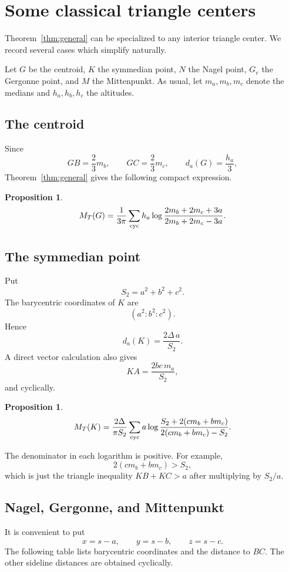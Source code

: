\documentclass[11pt]{article}
\newtheorem{proposition}[theorem]{Proposition}
\theoremstyle{remark}
\newcommand{\area}{\Delta}
\begin{document}
\section{Some classical triangle centers}

Theorem~\ref{thm:general} can be specialized to any interior triangle
center.  We record several cases which simplify naturally.

Let $G$ be the centroid, $K$ the symmedian point, $N$ the Nagel point,
$G_e$ the Gergonne point, and $M$ the Mittenpunkt.  As usual, let
$m_a,m_b,m_c$ denote the medians and $h_a,h_b,h_c$ the altitudes.

\subsection{The centroid}

Since
\[
 GB=\frac23m_b,\qquad
 GC=\frac23m_c,\qquad
 d_a(G)=\frac{h_a}{3},
\]
Theorem~\ref{thm:general} gives the following compact expression.

\begin{proposition}\label{prop:centroid}
\[
 {
 M_T(G)=
 \frac1{3\pi}\sum_{\rm cyc}
 h_a\log
 \frac{2m_b+2m_c+3a}
      {2m_b+2m_c-3a}.
 }
\]
\end{proposition}

\subsection{The symmedian point}

Put
\[
 S_2=a^2+b^2+c^2.
\]
The barycentric coordinates of $K$ are
\[
 (a^2:b^2:c^2).
\]
Hence
\[
 d_a(K)=\frac{2\area\,a}{S_2}.
\]
A direct vector calculation also gives
\[
 KA=\frac{2bc\,m_a}{S_2},
\]
and cyclically.

\begin{proposition}\label{prop:symmedian}
\[
 {
 M_T(K)=
 \frac{2\area}{\pi S_2}
 \sum_{\rm cyc}
 a\log
 \frac{S_2+2(cm_b+bm_c)}
      {2(cm_b+bm_c)-S_2}.
 }
\]
\end{proposition}

The denominator in each logarithm is positive.  For example,
\[
 2(cm_b+bm_c)>S_2,
\]
which is just the triangle inequality $KB+KC>a$ after multiplying
by $S_2/a$.

\subsection{Nagel, Gergonne, and Mittenpunkt}

It is convenient to put
\[
 x=s-a,\qquad y=s-b,\qquad z=s-c.
\]
The following table lists barycentric coordinates and the distance to
$BC$.  The other sideline distances are obtained cyclically.
\end{document}
